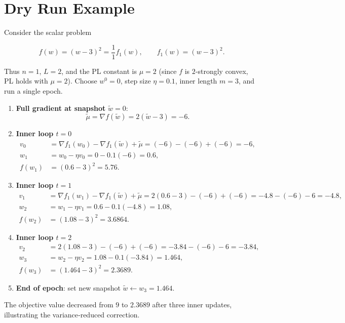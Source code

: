 \documentclass{article}
\begin{document}
\section*{Dry Run Example}
Consider the scalar problem  

\[
f(w)= (w-3)^{2}= \frac{1}{1} f_{1}(w), \qquad f_{1}(w)=(w-3)^{2}.
\]

Thus $n=1$, $L=2$, and the PL constant is $\mu=2$ (since $f$ is $2$‑strongly convex, PL holds with $\mu=2$).  
Choose $w^{0}=0$, step size $\eta=0.1$, inner length $m=3$, and run a single epoch.

\begin{enumerate}[label=\textbf{Iteration \arabic*:}, leftmargin=*]
\item \textbf{Full gradient at snapshot} $\tilde{w}=0$:
\[
\tilde{\mu}= \nabla f(\tilde{w}) = 2(\tilde{w}-3)= -6 .
\]

\item \textbf{Inner loop $t=0$}
\[
\begin{aligned}
v_{0}&=\nabla f_{1}(w_{0})-\nabla f_{1}(\tilde{w})+\tilde{\mu}
      = (-6)-(-6)+(-6) = -6,\\
w_{1}&= w_{0}-\eta v_{0}=0-0.1(-6)=0.6,\\
f(w_{1})&=(0.6-3)^{2}=5.76 .
\end{aligned}
\]

\item \textbf{Inner loop $t=1$}
\[
\begin{aligned}
v_{1}&= \nabla f_{1}(w_{1})-\nabla f_{1}(\tilde{w})+\tilde{\mu}
      = 2(0.6-3)-(-6)+(-6)= -4.8-(-6)-6 = -4.8,\\
w_{2}&= w_{1}-\eta v_{1}=0.6-0.1(-4.8)=1.08,\\
f(w_{2})&=(1.08-3)^{2}=3.6864 .
\end{aligned}
\]

\item \textbf{Inner loop $t=2$}
\[
\begin{aligned}
v_{2}&= 2(1.08-3)-(-6)+(-6)= -3.84-(-6)-6 = -3.84,\\
w_{3}&= w_{2}-\eta v_{2}=1.08-0.1(-3.84)=1.464,\\
f(w_{3})&=(1.464-3)^{2}=2.3689 .
\end{aligned}
\]

\item \textbf{End of epoch}: set new snapshot $\tilde{w}\leftarrow w_{3}=1.464$.
\end{enumerate}

The objective value decreased from $9$ to $2.3689$ after three inner updates, illustrating the variance‑reduced correction.
\end{document}
